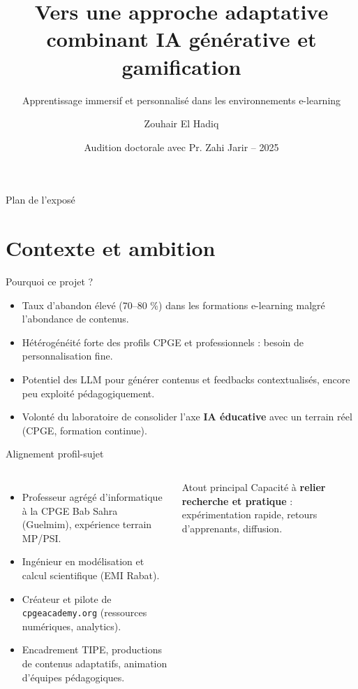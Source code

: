 \documentclass[aspectratio=169]{beamer}
\title{Vers une approche adaptative combinant IA générative et gamification}
\subtitle{Apprentissage immersif et personnalisé dans les environnements e-learning}
\author{Zouhair El Hadiq}
\institute{Professeur agrégé d'informatique -- CPGE Bab Sahra (Guelmim)\\Fondateur de la plateforme \texttt{cpgeacademy.org}}
\date{Audition doctorale avec Pr. Zahi Jarir -- 2025}
\begin{document}
\begin{frame}
  \titlepage
\end{frame}

\begin{frame}{Plan de l'exposé}
  \tableofcontents
\end{frame}

\section{Contexte et ambition}

\begin{frame}{Pourquoi ce projet ?}
  \begin{itemize}
    \item Taux d'abandon élevé (70--80 \%) dans les formations e-learning malgré l'abondance de contenus.
    \item Hétérogénéité forte des profils CPGE et professionnels : besoin de personnalisation fine.
    \item Potentiel des LLM pour générer contenus et feedbacks contextualisés, encore peu exploité pédagogiquement.
    \item Volonté du laboratoire de consolider l'axe \textbf{IA éducative} avec un terrain réel (CPGE, formation continue).
  \end{itemize}
\end{frame}

\begin{frame}{Alignement profil-sujet}
  \begin{columns}
    \begin{itemize}
      \item Professeur agrégé d'informatique à la CPGE Bab Sahra (Guelmim), expérience terrain MP/PSI.
      \item Ingénieur en modélisation et calcul scientifique (EMI Rabat).
      \item Créateur et pilote de \texttt{cpgeacademy.org} (ressources numériques, analytics).
      \item Encadrement TIPE, productions de contenus adaptatifs, animation d'équipes pédagogiques.
    \end{itemize}
    \begin{block}{Atout principal}
      Capacité à \textbf{relier recherche et pratique} : expérimentation rapide, retours d'apprenants, diffusion.
    \end{block}
  \end{columns}
\end{frame}
\end{document}
